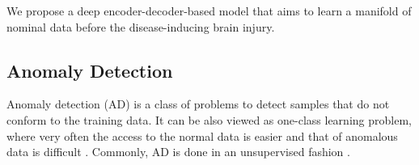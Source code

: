 \documentclass{article}
\begin{document}
	We propose a deep encoder-decoder-based model that aims to learn a manifold of nominal data before the disease-inducing brain injury.
	\subsection{Anomaly Detection}
	
	Anomaly detection (AD) is a class of problems to detect samples that do not conform to the training data. It can be also viewed as one-class learning problem, where very often the access to the normal data is easier and that of anomalous data is difficult \cite{shen2020timeseries,ruff2019self,ruff2018deep,shen2020timeseries}. Commonly, AD is done in an unsupervised fashion \cite{references}.
	
	
\end{document}
